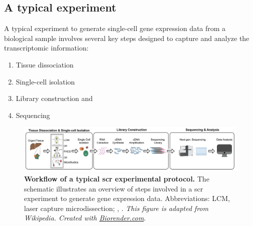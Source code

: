 
\subsection[A typical \glsentryshort{scr} experiment]{A typical  experiment}
\label{sec:scrna_typical}

\par A typical experiment to generate single-cell gene expression data from a biological sample involves several key steps designed to capture and analyze the transcriptomic information: 
\begin{enumerate}
\item Tissue dissociation
\item Single-cell isolation
\item Library construction and
\item Sequencing
\end{enumerate}

\begin{figure}[H]
    \centering
    \includegraphics[width=\linewidth]{Chapter1/Fig/F1-5-01.png}
    \caption[A typical  experiment]{\textbf{Workflow of a typical \gls{scr} experimental protocol.} The schematic illustrates an overview of steps involved in a \gls{scr} experiment to generate gene expression data. Abbreviations: LCM, laser capture microdissection; , . \textit{This figure is adapted from Wikipedia. Created with \href{https://www.biorender.com/}{Biorender.com}}.}
    \label{fig:chp1_scrna-2}
\end{figure}

